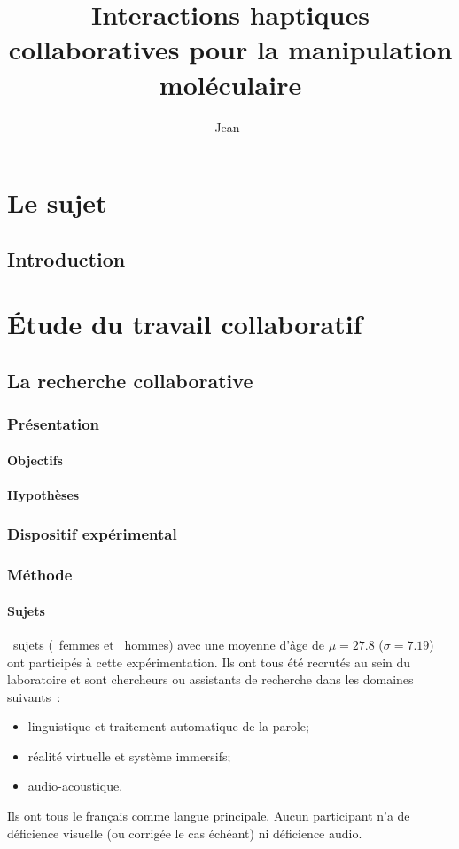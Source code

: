 \documentclass[myfrancais]{mythesis}
\title{Interactions haptiques collaboratives pour la manipulation moléculaire}
\author{Jean~\name{Simard}}
\date{\mydate[datestyle=long]{01/12/2011}}
\newcommand{\mynum}[1]{\nombre{#1}}
\begin{document}
	\frontmatter
	\maketitle
	\mytoc
	\mylof
	\mylot
	\mylotodo
	\mainmatter
	\part{Le sujet}
	\chapter{Introduction}
	\part{Étude du travail collaboratif}
	\chapter{La recherche collaborative}
	\section{Présentation}
	\subsection{Objectifs}
	\subsection{Hypothèses}
	\section{Dispositif expérimental}
	\section{Méthode}
	\subsection{Sujets}
	\mynum{24}~sujets (\mynum{4}~femmes et \mynum{20}~hommes) avec une moyenne d'âge de $\mu = 27.8$ ($\sigma = 7.19$) ont participés à cette expérimentation.
	Ils ont tous été recrutés au sein du laboratoire  et sont chercheurs ou assistants de recherche dans les domaines suivants~:
	\begin{itemize}
		\item linguistique et traitement automatique de la parole;
		\item réalité virtuelle et système immersifs;
		\item audio-acoustique.
	\end{itemize}
	Ils ont tous le français comme langue principale.
	Aucun participant n'a de déficience visuelle (ou corrigée le cas échéant) ni déficience audio.
	
\end{document}
